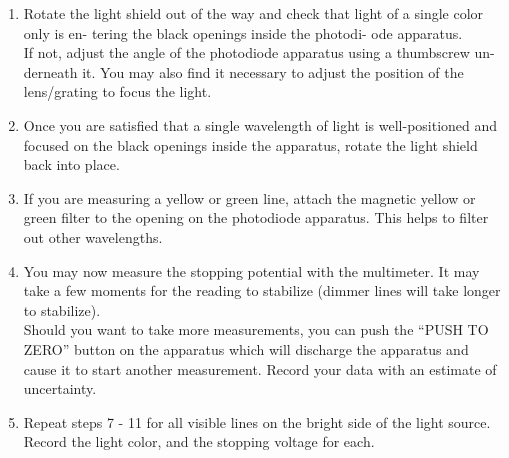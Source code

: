 \begin{enumerate}
{into the photodiode apparatus.}
	\item {Rotate the light shield out of the way and
check that light of a single color only is en-
tering the black openings inside the photodi-
ode apparatus. \\ If not, adjust the angle of the
photodiode apparatus using a thumbscrew un-
derneath it. You may also find it necessary to
adjust the position of the lens/grating to focus
the light.}
	\item {Once you are satisfied that a single wavelength of light is well-positioned and focused
on the black openings inside the apparatus, rotate the light shield back into place.}
	\item {If you are measuring a yellow or green line, attach the magnetic yellow or green filter to
the opening on the photodiode apparatus. This helps to filter out other wavelengths.}
\	\item {You may now measure the stopping potential with the multimeter. It may take a few
moments for the reading to stabilize (dimmer lines will take longer to stabilize). \\ Should
you want to take more measurements, you can push the “PUSH TO ZERO” button
on the apparatus which will discharge the apparatus and cause it to start another
measurement. Record your data with an estimate of uncertainty.}
	\item {Repeat steps 7 - 11 for all visible lines on the bright side of the light source. Record
the light color, and the stopping voltage for each.}
\end{enumerate}


